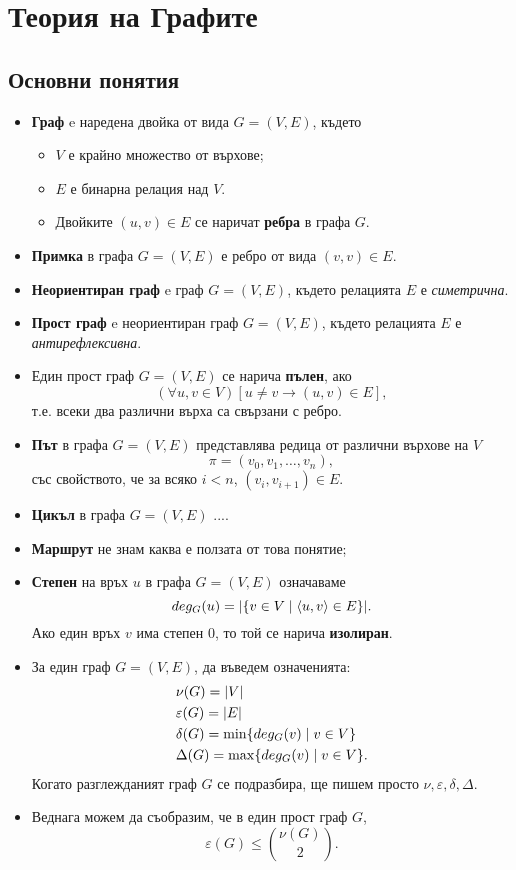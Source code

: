 \chapter{Теория на Графите}

\section{Основни понятия}

\begin{itemize}
\item
  {\bf Граф} e наредена двойка от вида $G = (V,E)$, 
  където
  \begin{itemize}
  \item 
    $V$ е крайно множество от върхове;
  \item
    $E$ е бинарна релация над $V$.
  \item
    Двойките $(u,v) \in E$ се наричат {\bf ребра} в графа $G$.
  \end{itemize}
\item
  {\bf Примка} в графа $G = (V,E)$ е ребро от вида $(v,v) \in E$.
\item
  {\bf Неориентиран граф} e граф $G = (V,E)$, 
  където релацията $E$ е {\em симетрична}.
\item
  {\bf Прост граф} e неориентиран граф $G = (V,E)$,
  където релацията $E$ е {\em антирефлексивна}.
\item
  Един прост граф $G = (V,E)$ се нарича {\bf пълен}, ако
  \[(\forall u,v\in V)[u \neq v \to (u,v) \in E],\]
  т.е. всеки два различни върха са свързани с ребро.
\item
  {\bf Път} в графа $G = (V,E)$ представлява редица от различни върхове на $V$
  \[\pi = (v_0,v_1,\dots,v_{n}),\]
  със свойството, че за всяко $i < n$,
  $(v_i,v_{i+1}) \in E$.
\item
  {\bf Цикъл} в графа $G = (V,E)$ ....
\item
  {\bf Маршрут} не знам каква е ползата от това понятие;
\item
  {\bf Степен} на връх $u$ в графа $G = (V,E)$ означаваме
  \[deg_G(u) = |\{v \in V \mid \langle{u,v}\rangle \in E\}|.\]
  Ако един връх $v$ има степен $0$, то той се нарича {\bf изолиран}.
\item
  За един граф $G = (V,E)$, да въведем означенията:
  \begin{align*}
    & \nu(G) = \lvert{V}\rvert\\
    & \varepsilon(G) = \lvert{E}\rvert\\
    & \delta(G) = \min\{deg_G(v) \mid v \in V\}\\
    & \Delta(G) = \max\{deg_G(v) \mid v \in V\}.
  \end{align*}
  Когато разглежданият граф $G$ се подразбира, ще пишем просто $\nu, \varepsilon, \delta, \Delta$.
\item
  Веднага можем да съобразим, че в един прост граф $G$,
  \[\varepsilon(G) \leq \binom{\nu(G)}{2}.\]
\end{itemize}

